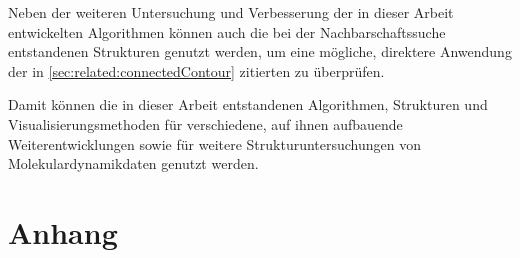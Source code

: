 Neben der weiteren Untersuchung und Verbesserung der in dieser Arbeit entwickelten Algorithmen können auch die bei der Nachbarschaftssuche entstandenen Strukturen genutzt werden, um eine mögliche, direktere Anwendung der in \autoref{sec:related:connectedContour} zitierten  zu überprüfen.

Damit können die in dieser Arbeit entstandenen Algorithmen, Strukturen und Visualisierungsmethoden für verschiedene, auf ihnen aufbauende Weiterentwicklungen sowie für weitere Strukturuntersuchungen von Molekulardynamikdaten genutzt werden.




\appendix

\chapter{Anhang}


